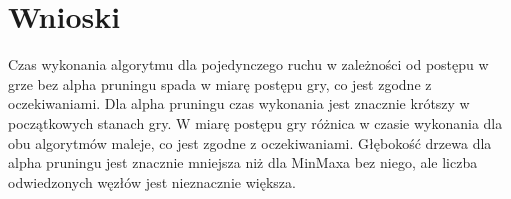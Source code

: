 \documentclass{article}
\begin{document}
\section{Wnioski}

Czas wykonania algorytmu dla pojedynczego ruchu w zależności od postępu w grze bez alpha pruningu spada w miarę postępu gry, co jest zgodne z oczekiwaniami.
Dla alpha pruningu czas wykonania jest znacznie krótszy w początkowych stanach gry. W miarę postępu gry różnica w czasie wykonania dla obu algorytmów maleje, co jest zgodne z oczekiwaniami.
Głębokość drzewa dla alpha pruningu jest znacznie mniejsza niż dla MinMaxa bez niego, ale liczba odwiedzonych węzłów jest nieznacznie większa.
\end{document}
